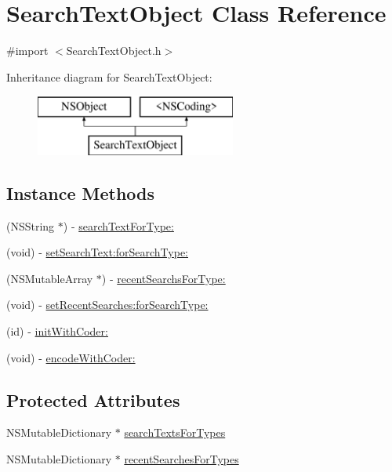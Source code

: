 \hypertarget{interface_search_text_object}{\section{Search\-Text\-Object Class Reference}
\label{interface_search_text_object}
}


{\ttfamily \#import $<$Search\-Text\-Object.\-h$>$}

Inheritance diagram for Search\-Text\-Object\-:\begin{figure}[H]
\begin{center}
\leavevmode
\includegraphics[height=2.000000cm]{interface_search_text_object}
\end{center}
\end{figure}
\subsection*{Instance Methods}
\begin{DoxyCompactItemize}
\item 
(N\-S\-String $\ast$) -\/ \hyperlink{interface_search_text_object_abbd96d5ccc280eac334e8d126ca73baa}{search\-Text\-For\-Type\-:}
\item 
(void) -\/ \hyperlink{interface_search_text_object_a0f6652753796600584cd7e943ee1c6d4}{set\-Search\-Text\-:for\-Search\-Type\-:}
\item 
(N\-S\-Mutable\-Array $\ast$) -\/ \hyperlink{interface_search_text_object_a2fa5bd4c4e64170eafc7d25ef0599a87}{recent\-Searchs\-For\-Type\-:}
\item 
(void) -\/ \hyperlink{interface_search_text_object_a86a1d1c48ae31a2ebd68c6c4e9e058ea}{set\-Recent\-Searches\-:for\-Search\-Type\-:}
\item 
(id) -\/ \hyperlink{interface_search_text_object_a6cf57c30ef62d8a0b74eafd74d0f8b39}{init\-With\-Coder\-:}
\item 
(void) -\/ \hyperlink{interface_search_text_object_a958c5e82e2f22a1a132161999b5d1704}{encode\-With\-Coder\-:}
\end{DoxyCompactItemize}
\subsection*{Protected Attributes}
\begin{DoxyCompactItemize}
\item 
N\-S\-Mutable\-Dictionary $\ast$ \hyperlink{interface_search_text_object_abea89e3a5b49f70a84ce07c6afb792c0}{search\-Texts\-For\-Types}
\item 
N\-S\-Mutable\-Dictionary $\ast$ \hyperlink{interface_search_text_object_a65254cbf048116b9c6e83c8837f00aa5}{recent\-Searches\-For\-Types}
\end{DoxyCompactItemize}
